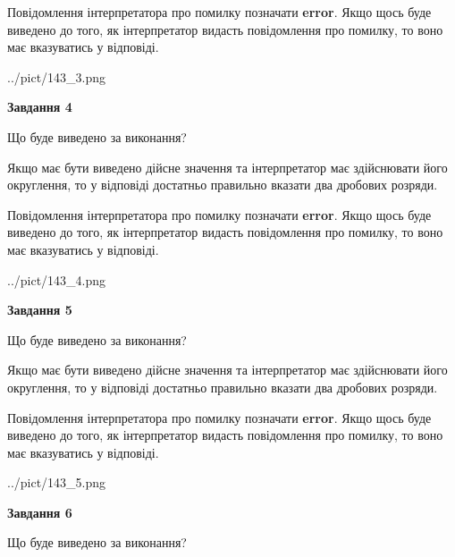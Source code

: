 \documentclass[12pt, ukrainian]{article}
\begin{document}
{\begin {Large}
Повідомлення інтерпретатора про помилку позначати \textbf{error}.
Якщо щось буде виведено до того, як інтерпретатор видасть повідомлення про помилку, 
то воно має вказуватись у відповіді. \par

\begin{center}
	{../pict/143_3.png}
\end{center}
\newpage

{\begin {center}\textbf{Завдання 4}\end {center}}\par
Що буде виведено за виконання? \par

Якщо має бути виведено дійсне значення та інтерпретатор має здійснювати його округлення, 
то у відповіді достатньо правильно вказати два дробових розряди.

Повідомлення інтерпретатора про помилку позначати \textbf{error}.
Якщо щось буде виведено до того, як інтерпретатор видасть повідомлення про помилку, 
то воно має вказуватись у відповіді. \par

\begin{center}
	{../pict/143_4.png}
\end{center}
\newpage

{\begin {center}\textbf{Завдання 5}\end {center}}\par
Що буде виведено за виконання? \par

Якщо має бути виведено дійсне значення та інтерпретатор має здійснювати його округлення, 
то у відповіді достатньо правильно вказати два дробових розряди.

Повідомлення інтерпретатора про помилку позначати \textbf{error}.
Якщо щось буде виведено до того, як інтерпретатор видасть повідомлення про помилку, 
то воно має вказуватись у відповіді. \par

\begin{center}
	{../pict/143_5.png}
\end{center}
\newpage

{\begin {center}\textbf{Завдання 6}\end {center}}\par
Що буде виведено за виконання? \par


\end{Large}}
\end{document}
